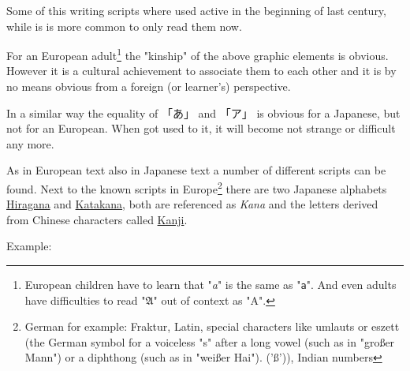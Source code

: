 Some of this writing scripts where used active in the beginning of last
century, while is is more common to only read them now.

For an European adult\footnote{European children have to learn that
"\textit{a}" is the same as "\texttt{a}". And even adults have difficulties to
read "$\mathfrak{A}$" out of context as "A".}  the "kinship" of the above
graphic elements is obvious. However it is a cultural achievement to associate
them to each other and it is by no means obvious from a foreign (or learner's)
perspective.

In a similar way the equality of {「あ」} and {「ア」} is obvious for a
Japanese, but not for an European. When got used to it, it will become not
strange or difficult any more.

As in European text also in Japanese text a number of different scripts can be
found. Next to the known scripts in Europe\footnote{German for example:
Fraktur, Latin, special characters like umlauts or eszett (the German
symbol for a voiceless "s" after a long vowel (such as in "großer Mann") or a
diphthong (such as in "weißer Hai"). ('ß')), Indian numbers} there are two
Japanese alphabets
 \hyperref[sec:Hiragana]{Hiragana} and
\hyperref[sec:Katakana]{Katakana}, both are referenced as \textit{Kana} and
the letters derived from Chinese characters called \hyperref[sec:Kanji]{Kanji}.

Example:

